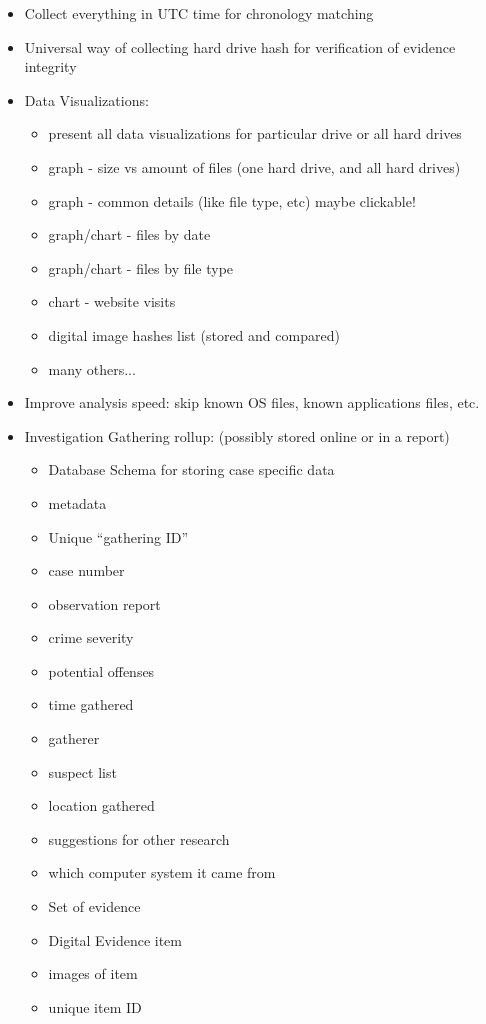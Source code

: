 \documentclass[12pt]{article}
\begin{document}
\begin{itemize}
  \item Collect everything in UTC time for chronology matching
  \item Universal way of collecting hard drive hash for verification of evidence integrity
  \item Data Visualizations:
  \begin{itemize}
    \item present all data visualizations for particular drive or all hard drives
    \item graph - size vs amount of files (one hard drive, and all hard drives)
    \item graph - common details (like file type, etc) maybe clickable!
    \item graph/chart - files by date
    \item graph/chart - files by file type
    \item chart - website visits
    \item digital image hashes list (stored and compared)
    \item many others...
  \end{itemize}
  \item Improve analysis speed: skip known OS files, known applications files, etc.
  \item Investigation Gathering rollup: (possibly stored online or in a report)
  \begin{itemize}
    \item Database Schema for storing case specific data
    \item metadata
    \item Unique ``gathering ID''
    \item case number
    \item observation report
    \item crime severity
    \item potential offenses
    \item time gathered
    \item gatherer
    \item suspect list
    \item location gathered
    \item suggestions for other research
    \item which computer system it came from
    \item Set of evidence
    \item Digital Evidence item
    \item images of item
    \item unique item ID

\end{itemize}
\end{itemize}
\end{document}
